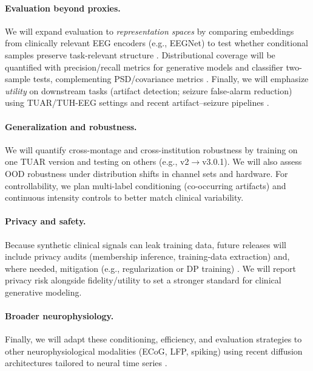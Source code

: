 \documentclass{article}
\begin{document}
\paragraph{Evaluation beyond proxies.}
We will expand evaluation to \emph{representation spaces} by comparing embeddings from clinically relevant EEG encoders (e.g., EEGNet) to test whether conditional samples preserve task-relevant structure \citep{lawhern2018eegnet}. Distributional coverage will be quantified with precision/recall metrics for generative models and classifier two-sample tests, complementing PSD/covariance metrics \citep{kynkaanniemi2019pr,lopezpaz2016c2st}. Finally, we will emphasize \emph{utility} on downstream tasks (artifact detection; seizure false-alarm reduction) using TUAR/TUH-EEG settings and recent artifact–seizure pipelines \citep{ingolfsson2024artifactseizure,obeid2016tueg,hamid2020tuar,vetter2024neurodiffusion}.

\paragraph{Generalization and robustness.}
We will quantify cross-montage and cross-institution robustness by training on one TUAR version and testing on others (e.g., v2$\rightarrow$v3.0.1). We will also assess OOD robustness under distribution shifts in channel sets and hardware. For controllability, we plan multi-label conditioning (co-occurring artifacts) and continuous intensity controls to better match clinical variability.

\paragraph{Privacy and safety.}
Because synthetic clinical signals can leak training data, future releases will include privacy audits (membership inference, training-data extraction) and, where needed, mitigation (e.g., regularization or DP training) \citep{carlini2019secretsharer,carlini2023extracting,duan2023mia,matsumoto2023mia}. We will report privacy risk alongside fidelity/utility to set a stronger standard for clinical generative modeling.

\paragraph{Broader neurophysiology.}
Finally, we will adapt these conditioning, efficiency, and evaluation strategies to other neurophysiological modalities (ECoG, LFP, spiking) using recent diffusion architectures tailored to neural time series \citep{vetter2024neurodiffusion}.
\end{document}
